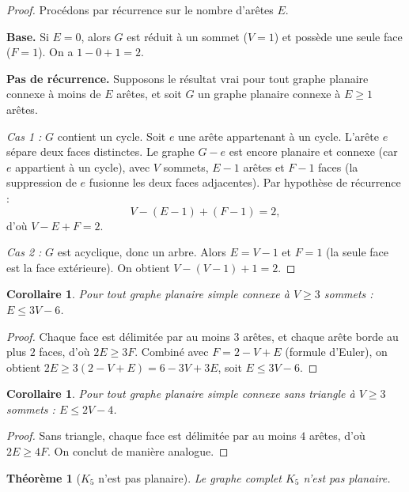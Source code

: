 \documentclass[12pt,a4paper,openany]{book}
\theoremstyle{definition}
\theoremstyle{plain}
\newtheorem{theoreme}[definition]{Théorème}
\newtheorem{corollaire}[definition]{Corollaire}
\theoremstyle{remark}
\begin{document}
\begin{proof}
Procédons par récurrence sur le nombre d'arêtes $E$.

\medskip\noindent
\textbf{Base.}\; Si $E = 0$, alors $G$ est réduit à un sommet ($V=1$)
et possède une seule face ($F=1$). On a $1 - 0 + 1 = 2$.

\medskip\noindent
\textbf{Pas de récurrence.}\; Supposons le résultat vrai pour tout graphe
planaire connexe à moins de $E$ arêtes, et soit $G$ un graphe planaire
connexe à $E \geq 1$ arêtes.

\emph{Cas 1 :} $G$ contient un cycle. Soit $e$ une arête appartenant à un
cycle. L'arête $e$ sépare deux faces distinctes. Le graphe $G - e$ est
encore planaire et connexe (car $e$ appartient à un cycle), avec $V$
sommets, $E-1$ arêtes et $F-1$ faces (la suppression de $e$ fusionne les
deux faces adjacentes). Par hypothèse de récurrence :
\[
  V - (E-1) + (F-1) = 2,
\]
d'où $V - E + F = 2$.

\emph{Cas 2 :} $G$ est acyclique, donc un arbre. Alors $E = V - 1$ et
$F = 1$ (la seule face est la face extérieure). On obtient
$V - (V-1) + 1 = 2$.
\end{proof}

\begin{corollaire}
\label{cor:euler-arete-borne}
Pour tout graphe planaire simple connexe à $V \geq 3$ sommets :
$E \leq 3V - 6$.
\end{corollaire}

\begin{proof}
Chaque face est délimitée par au moins $3$ arêtes, et chaque arête borde
au plus $2$ faces, d'où $2E \geq 3F$. Combiné avec $F = 2 - V + E$
(formule d'Euler), on obtient $2E \geq 3(2 - V + E) = 6 - 3V + 3E$,
soit $E \leq 3V - 6$.
\end{proof}

\begin{corollaire}
\label{cor:euler-sans-triangle}
Pour tout graphe planaire simple connexe sans triangle à $V \geq 3$ sommets :
$E \leq 2V - 4$.
\end{corollaire}

\begin{proof}
Sans triangle, chaque face est délimitée par au moins $4$ arêtes, d'où
$2E \geq 4F$. On conclut de manière analogue.
\end{proof}

\begin{theoreme}[$K_5$ n'est pas planaire]
\label{thm:K5-non-planaire}
Le graphe complet $K_5$ n'est pas planaire.
\end{theoreme}
\end{document}
